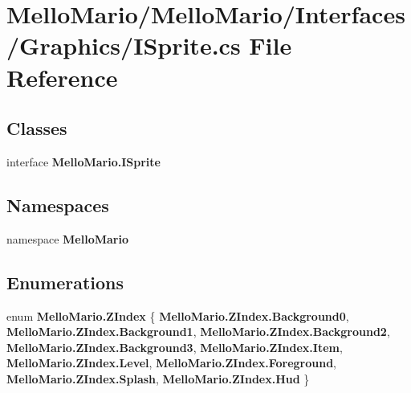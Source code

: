 \section{Mello\+Mario/\+Mello\+Mario/\+Interfaces/\+Graphics/\+I\+Sprite.cs File Reference}
\label{ISprite_8cs}
\subsection*{Classes}
\begin{DoxyCompactItemize}
\item 
interface \textbf{ Mello\+Mario.\+I\+Sprite}
\end{DoxyCompactItemize}
\subsection*{Namespaces}
\begin{DoxyCompactItemize}
\item 
namespace \textbf{ Mello\+Mario}
\end{DoxyCompactItemize}
\subsection*{Enumerations}
\begin{DoxyCompactItemize}
\item 
enum \textbf{ Mello\+Mario.\+Z\+Index} \{ \newline
\textbf{ Mello\+Mario.\+Z\+Index.\+Background0}, 
\textbf{ Mello\+Mario.\+Z\+Index.\+Background1}, 
\textbf{ Mello\+Mario.\+Z\+Index.\+Background2}, 
\textbf{ Mello\+Mario.\+Z\+Index.\+Background3}, 
\newline
\textbf{ Mello\+Mario.\+Z\+Index.\+Item}, 
\textbf{ Mello\+Mario.\+Z\+Index.\+Level}, 
\textbf{ Mello\+Mario.\+Z\+Index.\+Foreground}, 
\textbf{ Mello\+Mario.\+Z\+Index.\+Splash}, 
\newline
\textbf{ Mello\+Mario.\+Z\+Index.\+Hud}
 \}
\end{DoxyCompactItemize}
